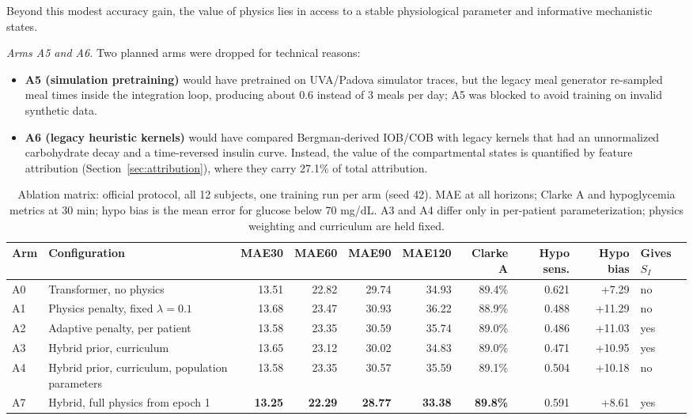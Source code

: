 \documentclass[journal]{IEEEtran}
\begin{document}
Beyond this modest accuracy gain, the value of physics lies in access to a stable physiological parameter and informative mechanistic states.

\textit{Arms A5 and A6.} Two planned arms were dropped for technical reasons:
\begin{itemize}
    \item \textbf{A5 (simulation pretraining)} would have pretrained on UVA/Padova simulator traces, but the legacy meal generator re-sampled meal times inside the integration loop, producing about 0.6 instead of 3 meals per day; A5 was blocked to avoid training on invalid synthetic data.
    \item \textbf{A6 (legacy heuristic kernels)} would have compared Bergman-derived IOB/COB with legacy kernels that had an unnormalized carbohydrate decay and a time-reversed insulin curve. Instead, the value of the compartmental states is quantified by feature attribution (Section~\ref{sec:attribution}), where they carry 27.1\% of total attribution.
\end{itemize}


\begin{table}[t]
\centering

\caption{Ablation matrix: official protocol, all 12 subjects, one training run per arm (seed 42). MAE at all horizons; Clarke A and hypoglycemia metrics at 30 min; hypo bias is the mean error for glucose below 70 mg/dL. A3 and A4 differ only in per-patient parameterization; physics weighting and curriculum are held fixed.}
\label{tab:ablation}
\footnotesize
\setlength{\tabcolsep}{4.5pt}
\begin{tabular}{llrrrrrrrl}
\toprule
Arm & Configuration & MAE30 & MAE60 & MAE90 & MAE120 & Clarke A & Hypo sens. & Hypo bias & Gives $S_I$ \\
\midrule
A0 & Transformer, no physics & 13.51 & 22.82 & 29.74 & 34.93 & 89.4\% & 0.621 & +7.29 & no \\
A1 & Physics penalty, fixed $\lambda=0.1$ & 13.68 & 23.47 & 30.93 & 36.22 & 88.9\% & 0.488 & +11.29 & no \\
A2 & Adaptive penalty, per patient & 13.58 & 23.35 & 30.59 & 35.74 & 89.0\% & 0.486 & +11.03 & yes \\
A3 & Hybrid prior, curriculum & 13.65 & 23.12 & 30.02 & 34.83 & 89.0\% & 0.471 & +10.95 & yes \\
A4 & Hybrid prior, curriculum, population parameters & 13.58 & 23.35 & 30.57 & 35.59 & 89.1\% & 0.504 & +10.18 & no \\
A7 & Hybrid, full physics from epoch 1 & \textbf{13.25} & \textbf{22.29} & \textbf{28.77} & \textbf{33.38} & \textbf{89.8\%} & 0.591 & +8.61 & yes \\
\bottomrule
\end{tabular}
\end{table}
\end{document}
